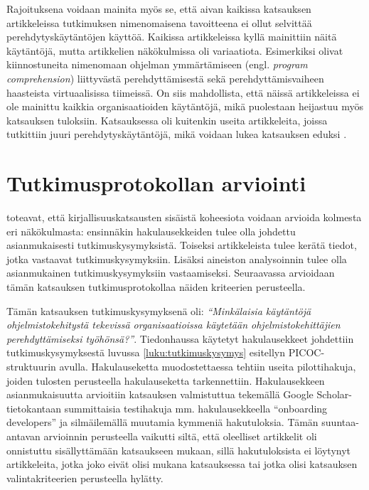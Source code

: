 \documentclass[utf8]{gradu3}
\begin{document}
Rajoituksena voidaan mainita myös se, että aivan kaikissa katsauksen artikkeleissa tutkimuksen nimenomaisena tavoitteena ei ollut selvittää perehdytyskäytäntöjen käyttöä. Kaikissa artikkeleissa kyllä mainittiin näitä käytäntöjä, mutta artikkelien näkökulmissa oli variaatiota. Esimerkiksi \textcite{yates-ym-2020} olivat kiinnostuneita nimenomaan ohjelman ymmärtämiseen (engl. \textit{program comprehension}) liittyvästä perehdyttämisestä sekä \textcite{hemphill-begel-2011} perehdyttämisvaiheen haasteista virtuaalisissa tiimeissä. On siis mahdollista, että näissä artikkeleissa ei ole mainittu kaikkia organisaatioiden käytäntöjä, mikä puolestaan heijastuu myös katsauksen tuloksiin. Katsauksessa oli kuitenkin useita artikkeleita, joissa tutkittiin juuri perehdytyskäytäntöjä, mikä voidaan lukea katsauksen eduksi
%
\parencites%
    {ju-ym-2021}%
    {britto-ym-2020}%
    {moe-ym-2020}%
    {viviani-murphy-2019}%
    {buchan-ym-2019}%
    {johnson-senges-2010}%
\relax.
%

\section{Tutkimusprotokollan arviointi}
\label{luku-tutkimusprotokollan-arviointi}

\textcite{kitchenham-charters-2007} toteavat, että kirjallisuuskatsausten sisäistä koheesiota voidaan arvioida kolmesta eri näkökulmasta: ensinnäkin hakulausekkeiden tulee olla johdettu asianmukaisesti tutkimuskysymyksistä. Toiseksi artikkeleista tulee kerätä tiedot, jotka vastaavat tutkimuskysymyksiin. Lisäksi aineiston analysoinnin tulee olla asianmukainen tutkimuskysymyksiin vastaamiseksi. Seuraavassa arvioidaan tämän katsauksen tutkimusprotokollaa näiden kriteerien perusteella.

Tämän katsauksen tutkimuskysymyksenä oli: \textit{“Minkälaisia käytäntöjä ohjelmistokehitystä tekevissä organisaatioissa käytetään ohjelmistokehittäjien perehdyttämiseksi työhönsä?”}. Tiedonhaussa käytetyt hakulausekkeet johdettiin tutkimuskysymyksestä luvussa \ref{luku:tutkimuskysymys} esitellyn PICOC-struktuurin avulla. Hakulauseketta muodostettaessa tehtiin useita pilottihakuja, joiden tulosten perusteella hakulauseketta tarkennettiin. Hakulausekkeen asianmukaisuutta arvioitiin katsauksen valmistuttua tekemällä Google Scholar-tietokantaan summittaisia testihakuja mm. hakulausekkeella “onboarding developers” ja silmäilemällä muutamia kymmeniä hakutuloksia. Tämän suuntaa-antavan arvioinnin perusteella vaikutti siltä, että oleelliset artikkelit oli onnistuttu sisällyttämään katsaukseen mukaan, sillä hakutuloksista ei löytynyt artikkeleita, jotka joko eivät olisi mukana katsauksessa tai jotka olisi katsauksen valintakriteerien perusteella hylätty. 
\end{document}
